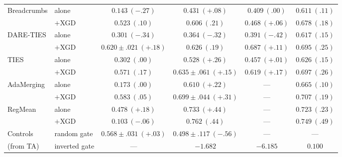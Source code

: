 \documentclass{article} %
\begin{document}
\begin{table}[t]
\begin{tabular}{llcccc}
\midrule
Breadcrumbs     & alone      & $0.143\ ({-}.27)$ & $0.431\ ({+}.08)$ & $0.409\ (.00)$ & $0.611\ (.11)$ \\
                & $+$XGD     & $0.523\ (.10)$ & $0.606\ (.21)$ & $0.468\ ({+}.06)$ & $0.678\ (.18)$ \\
\midrule
DARE-TIES       & alone      & $0.301\ ({-}.34)$ & $0.364\ ({-}.32)$ & $0.391\ ({-}.42)$ & $0.617\ (.15)$ \\
                & $+$XGD     & $\mathbf{0.620}{\pm}.021\ ({+}.18)$ & $0.626\ (.19)$ & $\mathbf{0.687}\ ({+}.11)$ & $0.695\ (.25)$ \\
\midrule
TIES            & alone      & $0.302\ (.00)$ & $0.528\ ({+}.26)$ & $0.457\ ({+}.01)$ & $0.626\ (.15)$ \\
                & $+$XGD     & $0.571\ (.17)$ & $0.635{\pm}.061\ ({+}.15)$ & $0.619\ ({+}.17)$ & $0.697\ (.26)$ \\
\midrule
AdaMerging      & alone      & $0.173\ (.00)$ & $0.610\ ({+}.22)$ & --- & $0.665\ (.10)$ \\
                & $+$XGD     & $0.583\ (.05)$ & $\mathbf{0.699}{\pm}.044\ ({+}.31)$ & --- & $0.707\ (.19)$ \\
\midrule
RegMean         & alone      & $0.478\ ({+}.18)$ & $0.733\ ({+}.44)$ & --- & $0.723\ (.23)$ \\
                & $+$XGD     & $0.103\ ({-}.06)$ & $\mathbf{0.762}\ (.44)$ & --- & $\mathbf{0.749}\ (.49)$ \\
\midrule
Controls        & random gate   & $0.568{\pm}.031\ ({+}.03)$ & $0.498{\pm}.117\ ({-}.56)$ & --- & --- \\
(from TA)       & inverted gate & --- & $-1.682$ & $-6.185$ & $0.100$ \\
\bottomrule
\end{tabular}
\end{table}
\fi
\end{document}
